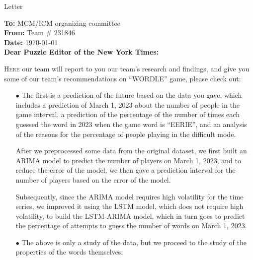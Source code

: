\documentclass[12pt]{article}  %
\begin{document}
\begin{letter}{Letter}
\begin{flushleft}  %
\textbf{To:} MCM/ICM organizing committee\\
\textbf{From:} Team \# 231846\\
\textbf{Date:} \today\\
\textbf{Dear Puzzle Editor of the New York Times: }
\end{flushleft}
\lettrine{H}{ere} our team will report to you our team's research and findings, and give you some of our team's recommendations on ``WORDLE'' game, please check out:
{\large{\itshape \begin{enumerate}[0]
    \item[$\bullet$] The first is a prediction of the future based on the data you gave, which includes a prediction of March 1, 2023 about the number of people in the game interval, a prediction of the percentage of the number of times each guessed the word in 2023 when the game word is ``EERIE'', and an analysis of the reasons for the percentage of people playing in the difficult mode.

    After we preprocessed some data from the original dataset, we first built an ARIMA model to predict the number of players on March 1, 2023, and to reduce the error of the model, we then gave a prediction interval for the number of players based on the error of the model.

    Subsequently, since the ARIMA model requires high volatility for the time series, we improved it using the LSTM model, which does not require high volatility, to build the LSTM-ARIMA model, which in turn goes to predict the percentage of attempts to guess the number of words on March 1, 2023.

    \item[$\bullet$] The above is only a study of the data, but we proceed to the study of the properties of the words themselves:


\end{enumerate}}}
\end{letter}
\end{document}
